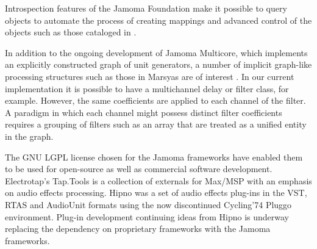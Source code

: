 \documentclass[twoside,10pt]{article}
\begin{document}
Introspection features of the Jamoma Foundation make it possible to query objects to automate the process of creating mappings and advanced control of the objects such as those cataloged in \cite{Pendharkar:2006}.


In addition to the ongoing development of Jamoma Multicore, which implements an explicitly constructed graph of unit generators, a number of implicit graph-like processing structures such as those in Marsyas are of interest \cite{Bray:2005}.
In our current implementation it is possible to have a multichannel delay or filter class, for example.  However, the same coefficients are applied to each channel of the filter.  A paradigm in which each channel might possess distinct filter coefficients requires a grouping of filters such as an array that are treated as a unified entity in the graph.



The GNU LGPL license chosen for the Jamoma frameworks have enabled them to be used for open-source as well as commercial software development.  Electrotap's Tap.Tools \cite{web17} is a collection of externals for Max/MSP with an emphasis on audio effects processing.  Hipno \cite{Place:2005} was a set of audio effects plug-ins in the VST, RTAS and AudioUnit formats using the now discontinued Cycling'74 Pluggo environment.  Plug-in development continuing ideas from Hipno is underway replacing the dependency on proprietary frameworks with the Jamoma frameworks.
\end{document}
